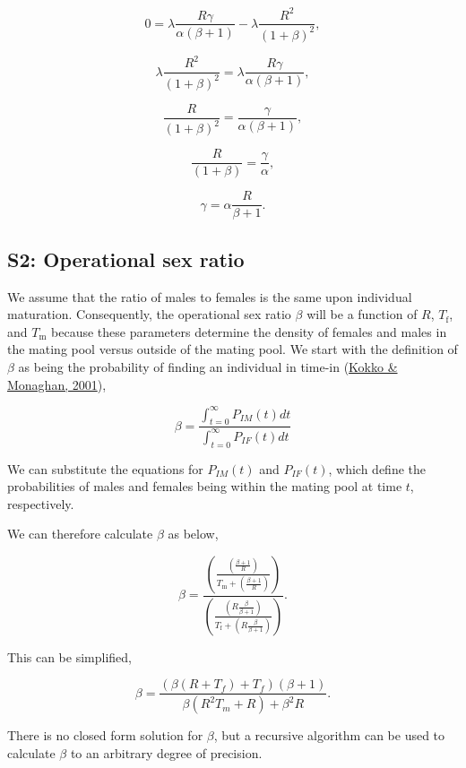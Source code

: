 \documentclass[
]{article}
\begin{document}
\[0 = \lambda \frac{R\gamma}{\alpha\left(\beta+1\right)} - \lambda\frac{R^{2}}{{\left(1 + \beta \right)^{2}}},\]

\[\lambda\frac{R^{2}}{{\left(1 + \beta \right)^{2}}} = \lambda \frac{R\gamma}{\alpha\left(\beta+1\right)},\]

\[\frac{R}{{\left(1 + \beta \right)^{2}}} =  \frac{\gamma}{\alpha\left(\beta+1\right)},\]

\[\frac{R}{{\left(1 + \beta \right)}} =  \frac{\gamma}{\alpha},\]

\[\gamma = \alpha \frac{R }{\beta + 1}.\]

\clearpage

\hypertarget{s2-operational-sex-ratio}{%
\subsection{S2: Operational sex ratio}\label{s2-operational-sex-ratio}}

We assume that the ratio of males to females is the same upon individual
maturation. Consequently, the operational sex ratio \(\beta\) will be a
function of \(R\), \(T_{\mathrm{f}}\), and \(T_{\mathrm{m}}\) because
these parameters determine the density of females and males in the
mating pool versus outside of the mating pool. We start with the
definition of \(\beta\) as being the probability of finding an
individual in time-in (\protect\hyperlink{ref-Kokko2001}{Kokko \&
Monaghan, 2001}),

\[\beta = \frac{\int_{t=0}^{\infty}P_{IM}(t)dt}{\int_{t=0}^{\infty}P_{IF}(t)dt}\]

We can substitute the equations for \(P_{IM}(t)\) and \(P_{IF}(t)\),
which define the probabilities of males and females being within the
mating pool at time \(t\), respectively.

We can therefore calculate \(\beta\) as below,

\[\beta = \frac{\left( \frac{\left(\frac{\beta + 1}{R}\right)}{T_{\mathrm{m}} + \left(\frac{\beta + 1}{R}\right)} \right)}{\left( \frac{\left(R \frac{\beta}{\beta + 1}\right)}{T_{\mathrm{f}} + \left(R \frac{\beta}{\beta + 1}\right)} \right)}.\]

This can be simplified,

\[\beta = \frac{\left(\beta\left(R + T_{f}\right) + T_{f}\right)\left(\beta + 1\right)}{\beta \left(R^{2}T_{m} + R\right) + \beta^{2}R}.\]

There is no closed form solution for \(\beta\), but a recursive
algorithm can be used to calculate \(\beta\) to an arbitrary degree of
precision.
\end{document}
